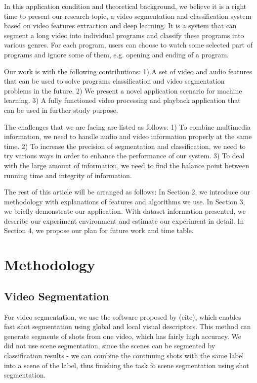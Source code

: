 \documentclass{article}
\begin{document}
In this application condition and theoretical background, we believe it is a right time to present our research topic, a video segmentation and classification system based on video features extraction and deep learning. It is a system that can segment a long video into individual programs and classify these programs into various genres. For each program, users can choose to watch some selected part of programs and ignore some of them, e.g. opening and ending of a program. 

Our work is with the following contributions: 1) A set of video and audio features that can be used to solve programs classification and video segmentation problems in the future. 2) We present a novel application scenario for machine learning. 3) A fully functioned video processing and playback application that can be used in further study purpose.

The challenges that we are facing are listed as follows: 1) To combine multimedia information, we need to handle audio and video information properly at the same time. 2) To increase the precision of segmentation and classification, we need to try various ways in order to enhance the performance of our system. 3) To deal with the large amount of information, we need to find the balance point between running time and integrity of information.

The rest of this article will be arranged as follows: In Section 2, we introduce our methodology with explanations of features and algorithms we use. In Section 3, we briefly demonstrate our application. With dataset information presented, we describe our experiment environment and estimate our experiment in detail. In Section 4, we propose our plan for future work and time table.

\section{Methodology}

\subsection{Video Segmentation}
For video segmentation, we use the software proposed by (cite), which enables fast shot segmentation using global and local visual descriptors. This method can generate segments of shots from one video, which has fairly high accuracy. We did not use scene segmentation, since the scenes can be segmented by classification results - we can combine the continuing shots with the same label into a scene of the label, thus finishing the task fo scene segmentation using shot segmentation.
\end{document}
